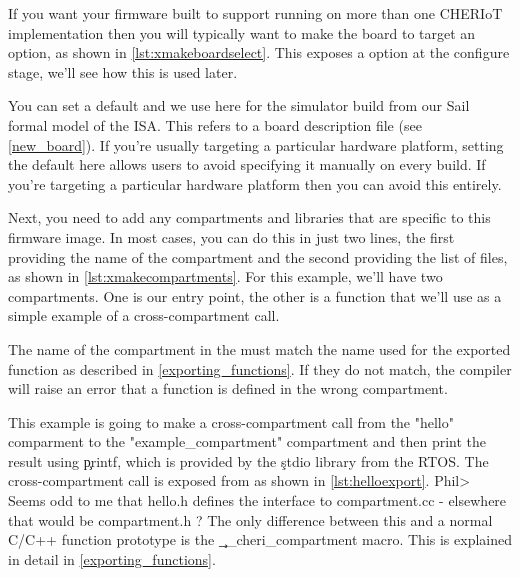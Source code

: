 If you want your firmware built to support running on more than one CHERIoT implementation then you will typically want to make the board to target an option, as shown in \ref{lst:xmakeboardselect}.
This exposes a  option at the configure stage, we'll see how this is used later.

\lualisting[filename=examples/hello_world/xmake.lua,marker=board,label=lst:xmakeboardselect,caption="Build system code for allowing the board to be selected at configure time"]{}

You can set a default and we use  here for the simulator build from our Sail formal model of the ISA.
This refers to a board description file (see \ref{new_board}).
If you're usually targeting a particular hardware platform, setting the default here allows users to avoid specifying it manually on every build.
If you're  targeting a particular hardware platform then you can avoid this entirely.

Next, you need to add any compartments and libraries that are specific to this firmware image.
In most cases, you can do this in just two lines, the first providing the name of the compartment and the second providing the list of files, as shown in \ref{lst:xmakecompartments}.
For this example, we'll have two compartments.
One is our entry point, the other is a function that we'll use as a simple example of a cross-compartment call.

\lualisting[filename=examples/hello_world/xmake.lua,marker=compartments,label=lst:xmakecompartments,caption="Build system code for building compartments"]{}

\begin{caution}
	The name of the compartment in the  must match the name used for the exported function as described in \ref{exporting_functions}.
	If they do not match, the compiler will raise an error that a function is defined in the wrong compartment.
\end{caution}

This example is going to make a cross-compartment call from the "hello" comparment to the "example_compartment" compartment and then print the result using \c{printf}, which is provided by the \c{stdio} library from the RTOS.
The cross-compartment call is exposed from  as shown in \ref{lst:helloexport}.
Phil> Seems odd to me that hello.h defines the interface to compartment.cc - elsewhere that would be compartment.h ? 
The only difference between this and a normal C/C++ function prototype is the \c{__cheri_compartment} macro.
This is explained in detail in \ref{exporting_functions}.

